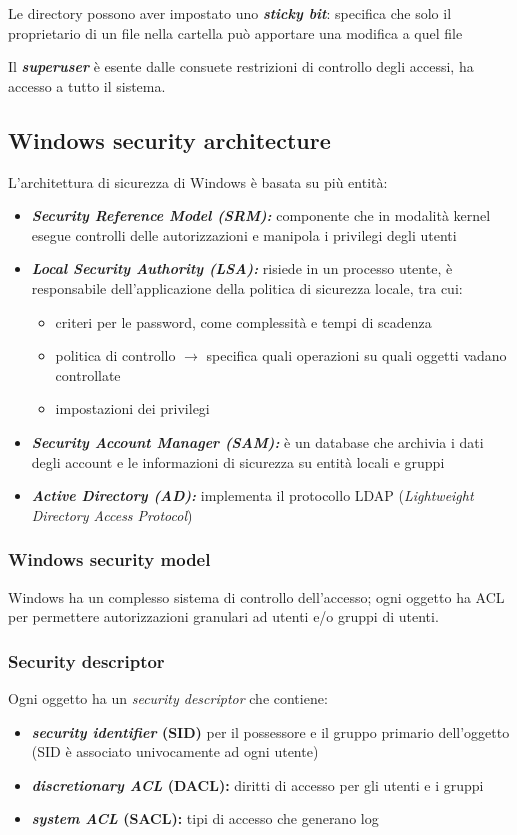 \documentclass{report}
\begin{document}
\noindent Le directory possono aver impostato uno \textit{\textbf{sticky bit}}: specifica che solo il proprietario di un file nella cartella
può apportare una modifica a quel file 

\noindent Il \textit{\textbf{superuser}} è esente dalle consuete restrizioni di controllo degli accessi, ha 
accesso a tutto il sistema.


\subsection{Windows security architecture}
L'architettura di sicurezza di Windows è basata su più entità:
\begin{itemize}
    \item \textbf{\textit{Security Reference Model (SRM):}} componente che in modalità kernel esegue 
    controlli delle autorizzazioni e manipola i privilegi degli utenti
    \item \textbf{\textit{Local Security Authority (LSA):}} risiede in un processo utente, è responsabile 
    dell'applicazione della politica di sicurezza locale, tra cui:
    \begin{itemize}
        \item criteri per le password, come complessità e tempi di scadenza 
        \item politica di controllo $\rightarrow$ specifica quali operazioni su quali oggetti vadano controllate 
        \item impostazioni dei privilegi
    \end{itemize}
    \item \textbf{\textit{Security Account Manager (SAM):}} è un database che archivia i dati degli account e le 
    informazioni di sicurezza su entità locali e gruppi
    \item \textbf{\textit{Active Directory (AD):}} implementa il protocollo LDAP (\textit{Lightweight Directory Access Protocol})
\end{itemize}

\subsubsection{Windows security model}
Windows ha un complesso sistema di controllo dell'accesso; ogni oggetto ha ACL per permettere autorizzazioni 
granulari ad utenti e/o gruppi di utenti.

\subsubsection{Security descriptor}
Ogni oggetto ha un \textit{security descriptor} che contiene:
\begin{itemize}
    \item \textbf{\textit{security identifier} (SID)} per il possessore e il gruppo primario dell'oggetto (SID è 
    associato univocamente ad ogni utente) 
    \item \textbf{\textit{discretionary ACL} (DACL):} diritti di accesso per gli utenti e i gruppi
    \item \textbf{\textit{system ACL} (SACL):} tipi di accesso che generano log
\end{itemize}
\end{document}
